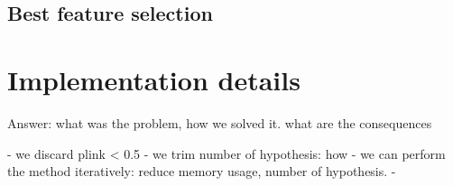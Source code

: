   		\subsection{Best feature selection }
  			\label{sec:linkerbestfeatures}
	    	\notyetimplemented{}	    	
	    	
	  \section{Implementation details \statusnew}
	  	\notyetimplemented{}
	  	
	  	Answer: what was the problem, how we solved it. what are the consequences
	  	
	  	- we discard plink < 0.5
	  	- we trim number of hypothesis: how
	  	- we can perform the method iteratively: reduce memory usage, number of hypothesis.
	  	- 